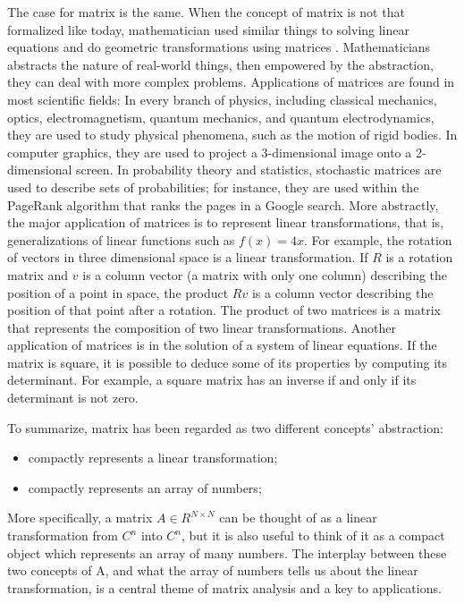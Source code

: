 \documentclass[a4paper]{book}
\begin{document}
    The case for matrix is the same. When the concept of matrix is not
    that formalized like today, mathematician used similar things to
    solving linear equations and do geometric transformations using
    matrices \cite{wiki_Matrix_(mathematics)}. Mathematicians
    abstracts the nature of real-world things, then empowered by the
    abstraction, they can deal with more complex problems.
    Applications of matrices are found in most scientific
    fields\cite{wiki_Matrix_(mathematics)}: In every branch of
    physics, including classical mechanics, optics, electromagnetism,
    quantum mechanics, and quantum electrodynamics, they are used to
    study physical phenomena, such as the motion of rigid bodies. In
    computer graphics, they are used to project a 3-dimensional image
    onto a 2-dimensional screen. In probability theory and statistics,
    stochastic matrices are used to describe sets of probabilities;
    for instance, they are used within the PageRank algorithm that
    ranks the pages in a Google search. More abstractly, the major
    application of matrices is to represent linear transformations, that
    is, generalizations of linear functions such as $f(x) = 4x$. For
    example, the rotation of vectors in three dimensional space is a
    linear transformation. If $R$ is a rotation matrix and $v$ is a
    column vector (a matrix with only one column) describing the
    position of a point in space, the product $Rv$ is a column vector
    describing the position of that point after a rotation. The product
    of two matrices is a matrix that represents the composition of two
    linear transformations. Another application of matrices is in the
    solution of a system of linear equations. If the matrix is square,
    it is possible to deduce some of its properties by computing its
    determinant. For example, a square matrix has an inverse if and only
    if its determinant is not zero.\cite{wiki_Matrix_(mathematics)}

    To summarize, matrix has been regarded as two different concepts'
    abstraction:

    \begin{itemize}
      \item compactly represents a linear transformation;
      \item compactly represents an array of numbers;
    \end{itemize}

    More specifically, a matrix $A \in R^{N\times N}$ can be thought of as a
    linear transformation from $C^n$ into $C^n$, but it is also useful to
    think of it as a compact object which represents an array of many
    numbers. The interplay between these two concepts of A, and what the
    array of numbers tells us about the linear transformation, is a central
    theme of matrix analysis and a key to applications\cite{horn2012matrix}.
\end{document}
